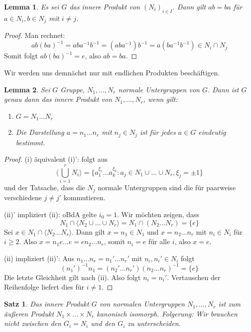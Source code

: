 \documentclass[12pt]{scrartcl}%
\newtheorem{thm}{Satz}
\newtheorem{lemma}{Lemma}
\theoremstyle{definition}
\theoremstyle{remark}
\newcommand{\inv}[1]{\left(#1\right)^{-1}}
\newcommand{\Inv}[1]{#1^{-1}}
\begin{document}
\begin{lemma}
    Es sei $G$ das innere Produkt von $(N_i)_{i\in I}$. Dann gilt $ab=ba$ für $a\in N_i, b\in N_j$ mit $i\neq j$.
\end{lemma}

\begin{proof}
    Man rechnet: $$ab\inv{ba}=ab\Inv{a}\Inv{b}=(ab\Inv{a})\Inv{b}=a(b\Inv{a}\Inv{b}) \in N_i\cap N_j$$ Somit folgt $ab\inv{ba}=e$, also $ab=ba$.
\end{proof}

Wir werden uns demnächst nur mit endlichen Produkten beschäftigen.

\begin{lemma}
    Sei $G$ Gruppe, $N_1,\dots,N_r$ normale Untergruppen von $G$. Dann ist $G$ genau dann das innere Produkt von $N_1,\dots,N_r$, wenn gilt:

    \begin{enumerate}[label=(\roman*)']
        \item $G=N_1\dots N_r$
        \item Die Darstellung $a=n_1\dots n_r$ mit $n_j\in N_j$ ist für jedes $a\in G$ eindeutig bestimmt.
    \end{enumerate}
\end{lemma}

\begin{proof}
    (i) äquivalent (i)': folgt aus $$\langle\bigcup_{i=1}^r N_i\rangle = \{a_1^{\xi_1}\dots a_k^{\xi_k}: a_j\in N_1\cup\dots \cup N_r, \xi_j = \pm 1\}$$ und der Tatsache, dass die $N_j$ normale Untergruppen sind die für paarweise verschiedene $j\neq j'$ kommutieren.

    (ii)' impliziert (ii): oBdA gelte $i_0=1$. Wir möchten zeigen, dass $$N_1\cap \langle N_2\cup\dots \cup N_r\rangle = N_1 \cap (N_2\dots N_r)= \{e\}$$ Sei $x\in N_1\cap \langle N_2\dots N_r\rangle$. Dann gilt $x=n_1\in N_1$ und $x=n_2\dots n_r$ mit $n_i\in N_i$ für $i\geq 2$. Also $x=n_1e\dots e=en_2\dots n_r$, somit $n_i=e$ für alle $i$, also $x=e$.

    (ii) impliziert (ii)': Aus $n_1\dots n_r=n_1'\dots n_r'$ mit $n_i,n_i'\in N_i$ folgt $$\inv{n_1'}n_1=(n_2'\dots n_r')\inv{n_2\dots n_r} = \{e\}$$ Die letzte Gleichheit gilt nach (ii). Also folgt $n_i=n_i'$. Vertauschen der Reihenfolge liefert dies für $i\neq 1$.
\end{proof}

\begin{thm}
    Das innere Produkt $G$ von normalen Untergruppen $N_1,\dots,N_r$ ist zum äußeren Produkt $N_1\times\dots \times N_r$ kanonisch isomorph.
    Folgerung: Wir brauchen nicht zwischen den $\overline{G_i}=N_i$ und den $G_i$ zu unterscheiden.
\end{thm}
\end{document}

